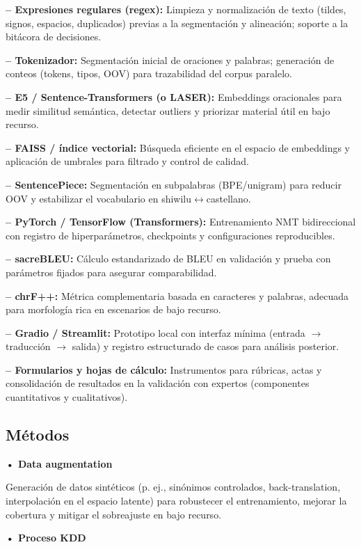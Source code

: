 \documentclass[12pt,a4paper,oneside]{book}
\begin{document}
\textbf{-- Expresiones regulares (regex):} Limpieza y normalización de texto (tildes, signos, espacios, duplicados) previas a la segmentación y alineación; soporte a la bitácora de decisiones.

\textbf{-- Tokenizador:} Segmentación inicial de oraciones y palabras; generación de conteos (tokens, tipos, OOV) para trazabilidad del corpus paralelo.

\textbf{-- E5 / Sentence-Transformers (o LASER):} Embeddings oracionales para medir similitud semántica, detectar outliers y priorizar material útil en bajo recurso.

\textbf{-- FAISS / índice vectorial:} Búsqueda eficiente en el espacio de embeddings y aplicación de umbrales para filtrado y control de calidad.

\textbf{-- SentencePiece:} Segmentación en subpalabras (BPE/unigram) para reducir OOV y estabilizar el vocabulario en shiwilu$\leftrightarrow$castellano.

\textbf{-- PyTorch / TensorFlow (Transformers):} Entrenamiento NMT bidireccional con registro de hiperparámetros, checkpoints y configuraciones reproducibles.

\textbf{-- sacreBLEU:} Cálculo estandarizado de BLEU en validación y prueba con parámetros fijados para asegurar comparabilidad.

\textbf{-- chrF++:} Métrica complementaria basada en caracteres y palabras, adecuada para morfología rica en escenarios de bajo recurso.

\textbf{-- Gradio / Streamlit:} Prototipo local con interfaz mínima (entrada $\rightarrow$ traducción $\rightarrow$ salida) y registro estructurado de casos para análisis posterior.

\textbf{-- Formularios y hojas de cálculo:} Instrumentos para rúbricas, actas y consolidación de resultados en la validación con expertos (componentes cuantitativos y cualitativos).

\subsection{Métodos}\label{muxe9todos}

\textbf{• Data augmentation}

Generación de datos sintéticos (p. ej., sinónimos controlados, back-translation, interpolación en el espacio latente) para robustecer el entrenamiento, mejorar la cobertura y mitigar el sobreajuste en bajo recurso.

\textbf{• Proceso KDD}
\end{document}
